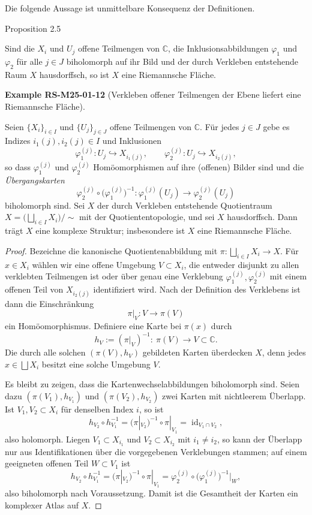 \documentclass[10pt, letterpaper]{article}
\newcommand{\C}{\mathbb{C}}
\newcommand{\CustomHeading}[3]{%
  \par\medskip\noindent%
  \textbf{#1 #2} \textnormal{(#3)}.\enskip%
}
\newenvironment{EXA}[2]{\begin{unitbox}\CustomHeading{Example}{#1}{#2}}{\end{unitbox}}
\begin{document}
Die folgende Aussage ist unmittelbare Konsequenz der Definitionen.

Proposition 2.5 

Sind die $X_{i}$ und $U_{j}$ offene Teilmengen von $\mathbb{C}$, die Inklusionsabbildungen $\varphi_{1}$ und $\varphi_{2}$ für alle $j \in J$ biholomorph auf ihr Bild und der durch Verkleben entstehende Raum $X$ hausdorffsch, so ist $X$ eine Riemannsche Fläche.



\begin{EXA}{RS-M25-01-12}{Verkleben offener Teilmengen der Ebene liefert eine Riemannsche Fläche}
Seien $\{X_i\}_{i\in I}$ und $\{U_j\}_{j\in J}$ offene Teilmengen von $\C$. Für jedes $j\in J$ gebe es Indizes
$i_1(j),i_2(j)\in I$ und Inklusionen
\[
\varphi^{(j)}_1:U_j\hookrightarrow X_{i_1(j)},\qquad
\varphi^{(j)}_2:U_j\hookrightarrow X_{i_2(j)},
\]
so dass $\varphi^{(j)}_1$ und $\varphi^{(j)}_2$ Homöomorphismen auf ihre (offenen) Bilder sind und die \emph{Übergangskarten}
\[
\varphi^{(j)}_2\circ\bigl(\varphi^{(j)}_1\bigr)^{-1}:
\varphi^{(j)}_1(U_j)\longrightarrow \varphi^{(j)}_2(U_j)
\]
biholomorph sind. Sei $X$ der durch Verkleben entstehende Quotientraum
\(
X=\bigl(\bigsqcup_{i\in I}X_i\bigr)\big/\!\sim
\)
mit der Quotiententopologie, und sei $X$ hausdorffsch. Dann trägt $X$ eine komplexe Struktur; insbesondere ist $X$ eine Riemannsche Fläche.


\begin{proof}
Bezeichne die kanonische Quotientenabbildung mit
\(
\pi:\bigsqcup_{i\in I}X_i\to X.
\)
Für $x\in X_i$ wählen wir eine offene Umgebung $V\subset X_i$, die entweder disjunkt zu allen verklebten Teilmengen ist
oder über genau eine Verklebung $\varphi^{(j)}_1,\varphi^{(j)}_2$ mit einem offenen Teil von $X_{i_2(j)}$ identifiziert wird.
Nach der Definition des Verklebens ist dann die Einschränkung
\[
\pi|_V:V\longrightarrow \pi(V)
\]
ein Homöomorphismus. Definiere eine Karte bei $\pi(x)$ durch
\[
h_V := (\pi|_V)^{-1}:\ \pi(V)\longrightarrow V\subset\C.
\]
Die durch alle solchen $(\pi(V),h_V)$ gebildeten Karten überdecken $X$, denn jedes $x\in\bigsqcup X_i$ besitzt eine solche Umgebung
$V$.

Es bleibt zu zeigen, dass die Kartenwechselabbildungen biholomorph sind. Seien dazu $(\pi(V_1),h_{V_1})$ und
$(\pi(V_2),h_{V_2})$ zwei Karten mit nichtleerem Überlapp. Ist $V_1,V_2\subset X_i$ für denselben Index $i$, so ist
\[
h_{V_2}\circ h_{V_1}^{-1}
=\bigl(\pi|_{V_2}\bigr)^{-1}\circ \pi|_{V_1}
= \operatorname{id}_{V_1\cap V_2},
\]
also holomorph. Liegen $V_1\subset X_{i_1}$ und $V_2\subset X_{i_2}$ mit $i_1\neq i_2$, so kann der Überlapp nur aus Identifikationen
über die vorgegebenen Verklebungen stammen; auf einem geeigneten offenen Teil $W\subset V_1$ ist
\[
h_{V_2}\circ h_{V_1}^{-1}
=\bigl(\pi|_{V_2}\bigr)^{-1}\circ \pi|_{V_1}
= \varphi^{(j)}_2\circ\bigl(\varphi^{(j)}_1\bigr)^{-1}\big|_{W},
\]
also biholomorph nach Voraussetzung. Damit ist die Gesamtheit der Karten ein komplexer Atlas auf $X$.


\end{proof}
\end{EXA}
\end{document}
